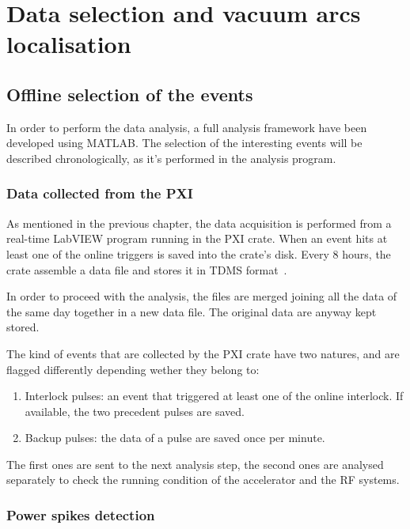 \chapter[Data selection and vacuum arcs localisation]{Data selection and vacuum arcs localisation}

\section[Offline selection of the events]{Offline selection of the events}

In order to perform the data analysis, a full analysis framework have been developed using MATLAB. The selection of the interesting events will be described chronologically, as it's performed in the analysis program.

\subsection[Data collected from the PXI]{Data collected from the PXI}

As mentioned in the previous chapter, the data acquisition is performed from a real-time LabVIEW program running in the PXI crate. When an event hits at least one of the online triggers is saved into the crate's disk. Every 8 hours, the crate assemble a data file and stores it in TDMS format~\cite{NI:TDMS}. 

In order to proceed with the analysis, the files are merged joining all the data of the same day together in a new data file. The original data are anyway kept stored.

The kind of events that are collected by the PXI crate have two natures, and are flagged differently depending wether they belong to:
\begin{enumerate}
\item Interlock pulses: an event that triggered at least one of the online interlock. If available, the two precedent pulses are saved.
\item Backup pulses: the data of a pulse are saved once per minute.
\end{enumerate}
The first ones are sent to the next analysis step, the second ones are analysed separately to check the running condition of the accelerator and the RF systems.


\newpage
\subsection[Power spikes detection]{Power spikes detection}

